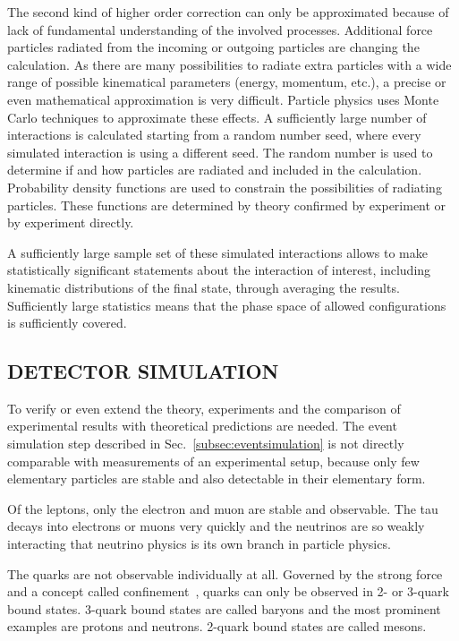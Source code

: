 \documentclass{wscpaperproc}
\theoremstyle{wsc}
\begin{document}
The second kind of higher order correction can only be approximated because of lack of fundamental understanding of the involved processes. Additional force particles radiated from the incoming or outgoing particles are changing the calculation. As there are many possibilities to radiate extra particles with a wide range of possible kinematical parameters (energy, momentum, etc.), a precise or even mathematical approximation is very difficult. Particle physics uses Monte Carlo techniques to approximate these effects. A sufficiently large number of interactions is calculated starting from a random number seed, where every simulated interaction is using a different seed. The random number is used to determine if and how particles are radiated and included in the calculation. Probability density functions are used to constrain the possibilities of radiating particles. These functions are determined by theory confirmed by experiment or by experiment directly.

A sufficiently large sample set of these simulated interactions allows to make statistically significant statements about the interaction of interest, including kinematic distributions of the final state, through averaging the results. Sufficiently large statistics means that the phase space of allowed configurations is sufficiently covered.

\subsection{DETECTOR SIMULATION} 
\label{subsec:detectorsimulation}

To verify or even extend the theory, experiments and the comparison of experimental results with theoretical predictions are needed. The event simulation step described in Sec.~\ref{subsec:eventsimulation} is not directly comparable with measurements of an experimental setup, because only few elementary particles are stable and also detectable in their elementary form.

Of the leptons, only the electron and muon are stable and observable. The tau decays into electrons or muons very quickly and the neutrinos are so weakly interacting that neutrino physics is its own branch in particle physics. 

The quarks are not observable individually at all. Governed by the strong force and a concept called confinement~, quarks can only be observed in 2- or 3-quark bound states. 3-quark bound states are called baryons and the most prominent examples are protons and neutrons. 2-quark bound states are called mesons. 
\end{document}
